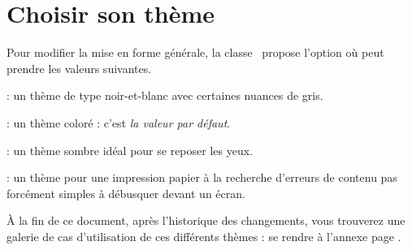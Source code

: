 \documentclass{../main/main}
\begin{document}
\section{Choisir son thème}

Pour modifier la mise en forme générale, la classe \thisproj\ propose l'option  où  peut prendre les valeurs suivantes.

\begin{tasks}[style=itemize]
    \task {}:
          un thème de type noir-et-blanc avec certaines nuances de gris.

    \task {}:
          un thème coloré : c'est \emph{la valeur par défaut}.

    \task {}:
          un thème sombre idéal pour se reposer les yeux.

    \task {}:
          un thème pour une impression papier à la recherche d'erreurs de contenu pas forcément simples à débusquer devant un écran.
\end{tasks}


\begin{tdocnote}
    À la fin de ce document, après l'historique des changements, vous trouverez une galerie de cas d'utilisation de ces différents thèmes : se rendre à l'annexe page \pageref{tutodoc-theme-gallery}.
\end{tdocnote}
\end{document}
